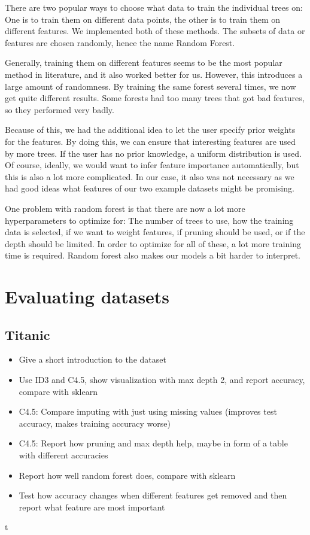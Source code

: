 \documentclass[a4paper]{article}
\begin{document}
There are two popular ways to choose what data to train the individual trees on: One is to train them on different data points, the other is to train them on different features. We implemented both of these methods. The subsets of data or features are chosen randomly, hence the name Random Forest.

Generally, training them on different features seems to be the most popular method in literature, and it also worked better for us. However, this introduces a large amount of randomness. By training the same forest several times, we now get quite different results. Some forests had too many trees that got bad features, so they performed very badly.

Because of this, we had the additional idea to let the user specify prior weights for the features. By doing this, we can ensure that interesting features are used by more trees. If the user has no prior knowledge, a uniform distribution is used. Of course, ideally, we would want to infer feature importance automatically, but this is also a lot more complicated. In our case, it also was not necessary as we had good ideas what features of our two example datasets might be promising.

One problem with random forest is that there are now a lot more hyperparameters to optimize for: The number of trees to use, how the training data is selected, if we want to weight features, if pruning should be used, or if the depth should be limited. In order to optimize for all of these, a lot more training time is required. Random forest also makes our models a bit harder to interpret.

\section{Evaluating datasets}

\subsection{Titanic}

\begin{itemize}
	\item Give a short introduction to the dataset
    \item Use ID3 and C4.5, show visualization with max depth 2, and report accuracy, compare with sklearn
    \item C4.5: Compare imputing with just using missing values (improves test accuracy, makes training accuracy worse)
    \item C4.5: Report how pruning and max depth help, maybe in form of a table with different accuracies
    \item Report how well random forest does, compare with sklearn
    \item Test how accuracy changes when different features get removed and then report what feature are most important
\end{itemize}t
\end{document}
